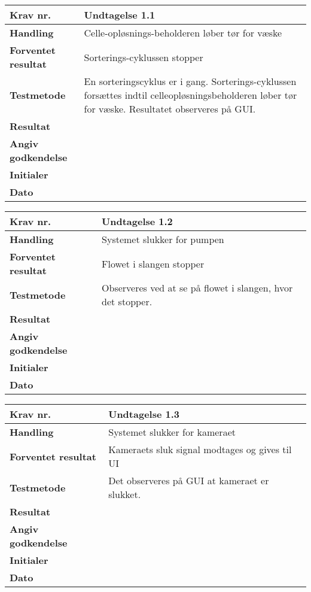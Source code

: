 \begin{center}
		\begin{longtable}{ | m{4cm}| m{8.5cm}|} 
			\hline
			\textbf{Krav nr.} & Undtagelse 1.1  \\ 
			\hline
			\textbf{Handling} & Celle-opløsnings-beholderen løber tør for væske   \\
			\hline
			\textbf{Forventet resultat} & Sorterings-cyklussen stopper \\
			\hline
			\textbf{Testmetode}  & En sorteringscyklus er i gang. Sorterings-cyklussen forsættes indtil celleopløsningsbeholderen løber tør for væske. Resultatet observeres på GUI.  \\
			\hline
			\textbf{Resultat}  &    \\
			\hline
			\textbf{Angiv godkendelse} &     \\
			\hline
			\textbf{Initialer} &     \\
			\hline
			\textbf{Dato} &    \\
			\hline
		\end{longtable}
	\end{center}
			
	\begin{center}
		\begin{longtable}{ | m{4cm}| m{8.5cm}|} 
			\hline
			\textbf{Krav nr.} & Undtagelse 1.2  \\ 
			\hline
			\textbf{Handling} & Systemet slukker for pumpen   \\
			\hline
			\textbf{Forventet resultat} & Flowet i slangen stopper \\
			\hline
			\textbf{Testmetode}  & Observeres ved at se på flowet i slangen, hvor det stopper. \\
			\hline
			\textbf{Resultat}  &    \\
			\hline
			\textbf{Angiv godkendelse} &     \\
			\hline
			\textbf{Initialer} &     \\
			\hline
			\textbf{Dato} &    \\
			\hline
		\end{longtable}
	\end{center}
			
	\begin{center}
		\begin{longtable}{ | m{4cm}| m{8.5cm}|} 
			\hline
			\textbf{Krav nr.} & Undtagelse 1.3  \\ 
			\hline
			\textbf{Handling} & Systemet slukker for kameraet  \\
			\hline
			\textbf{Forventet resultat} & Kameraets sluk signal modtages og gives til UI \\
			\hline
			\textbf{Testmetode}  & Det observeres på GUI at kameraet er slukket.  \\
			\hline
			\textbf{Resultat}  &    \\
			\hline
			\textbf{Angiv godkendelse} &     \\
			\hline
			\textbf{Initialer} &     \\
			\hline
			\textbf{Dato} &    \\
			\hline
		\end{longtable}
	\end{center}
			
